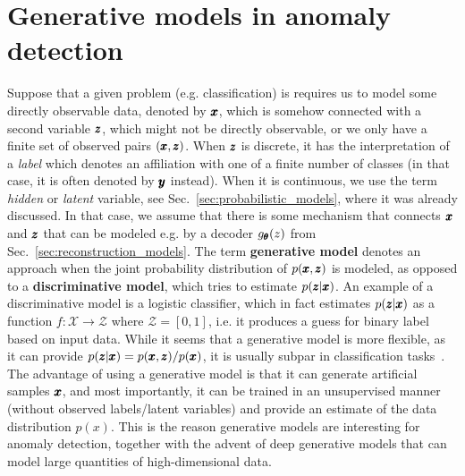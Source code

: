 \chapter{Generative models in anomaly detection} \label{sec:chapter_survey}
Suppose that a given problem (e.g. classification) is requires us to model some directly observable data, denoted by $\pmb{{x}}$, which is somehow connected with a second variable $\pmb{{z}}$, which might not be directly observable, or we only have a finite set of observed pairs $(\pmb{{x}},\pmb{{z}})$. When $\pmb{{z}}$ is discrete, it has the interpretation of a \textit{label} which denotes an affiliation with one of a finite number of classes (in that case, it is often denoted by $\pmb{{y}}$ instead). When it is continuous, we use the term \textit{hidden} or \textit{latent} variable, see Sec.~\ref{sec:probabilistic_models}, where it was already discussed. In that case, we assume that there is some mechanism that connects $\pmb{{x}}$ and $\pmb{{z}}$ that can be modeled e.g. by a decoder $g_{\pmb{{\theta}}}(z)$ from Sec.~\ref{sec:reconstruction_models}. The term \textbf{generative model} denotes an approach when the joint probability distribution of $p(\pmb{{x}},\pmb{{z}})$ is modeled, as opposed to a \textbf{discriminative model}, which tries to estimate $p(\pmb{{z}} \vert \pmb{{x}})$. An example of a discriminative model is a logistic classifier, which in fact estimates $p(\pmb{{z}} \vert \pmb{{x}})$ as a function $f:\mathcal{X} \rightarrow \mathcal{Z}$ where $\mathcal{Z} = [0,1]$, i.e. it produces a guess for binary label based on input data. While it seems that a generative model is more flexible, as it can provide  $p(\pmb{{z}} \vert \pmb{{x}}) = p(\pmb{{x}},\pmb{{z}})/p(\pmb{{x}})$, it is usually subpar in classification tasks~\cite{ng2001discriminative,bishop2007generative}. The advantage of using a generative model is that it can generate artificial samples $\pmb{{x}}$, and most importantly, it can be trained in an unsupervised manner (without observed labels/latent variables) and provide an estimate of the data distribution $p(x)$. This is the reason generative models are interesting for anomaly detection, together with the advent of deep generative models that can model large quantities of high-dimensional data.

